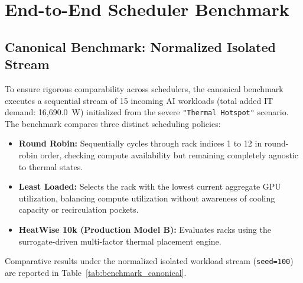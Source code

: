 \documentclass[conference,10pt]{IEEEtran}
\begin{document}
\section{End-to-End Scheduler Benchmark}
\label{sec:benchmark}

\subsection{Canonical Benchmark: Normalized Isolated Stream}
To ensure rigorous comparability across schedulers, the canonical benchmark executes a sequential stream of 15 incoming AI workloads (total added IT demand: 16,690.0~W) initialized from the severe \texttt{"Thermal Hotspot"} scenario. The benchmark compares three distinct scheduling policies:
\begin{itemize}
    \item \textbf{Round Robin:} Sequentially cycles through rack indices 1 to 12 in round-robin order, checking compute availability but remaining completely agnostic to thermal states.
    \item \textbf{Least Loaded:} Selects the rack with the lowest current aggregate GPU utilization, balancing compute utilization without awareness of cooling capacity or recirculation pockets.
    \item \textbf{HeatWise 10k (Production Model B):} Evaluates racks using the surrogate-driven multi-factor thermal placement engine.
\end{itemize}

Comparative results under the normalized isolated workload stream (\texttt{seed=100}) are reported in Table~\ref{tab:benchmark_canonical}.
\end{document}
